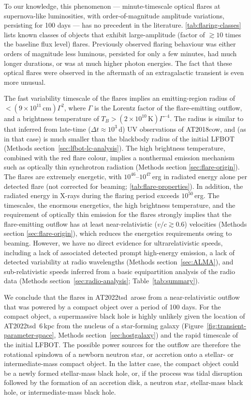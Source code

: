 \documentclass{nature_plusfigure}
\newcommand{\at}{AT2022tsd}
\begin{document}
To our knowledge, this phenomenon --- minute-timescale optical flares at supernova-like luminosities, with order-of-magnitude amplitude variations, persisting for 100 days --- has no precedent in the literature.
\ref{tab:flaring-classes} lists known classes of objects that exhibit large-amplitude (factor of $\gtrsim10$ times the baseline flux level) flares. Previously observed flaring behaviour was either orders of magnitude less luminous, persisted for only a few minutes, had much longer durations, or was at much higher photon energies.
The fact that these optical flares were observed in the aftermath of an extragalactic transient is even more unusual.

The fast variability timescale of the flares implies an emitting-region radius of $<(9\times10^{11}\,\mathrm{cm}) \Gamma^2$, where $\Gamma$ is the Lorentz factor of the flare-emitting outflow,
and a brightness temperature of $T_B>(2\times10^{10}\,\mathrm{K})\Gamma^{-4}$.
The radius is similar to that inferred from late-time ($\Delta t\approx10^3\,$d) UV observations of AT2018cow\cite{Chen2023b}, and (as in that case) is much smaller than the blackbody radius of the initial LFBOT (Methods section~\ref{sec:lfbot-lc-analysis}).
The high brightness temperature, combined with the red flare colour, implies a nonthermal emission mechanism such as optically thin synchrotron radiation (Methods section \ref{sec:flare-origin}).
The flares are extremely energetic, with $10^{46}$--$10^{47}$\,erg in radiated energy alone per detected flare (not corrected for beaming; \ref{tab:flare-properties}).
In addition, the radiated energy in X-rays during the flaring period exceeds $10^{50}$\,erg.
The timescales, the enormous energetics, the high brightness temperature, and the requirement of optically thin emission for the flares strongly implies that the flare-emitting outflow has at least near-relativistic ($v/c\gtrsim0.6$) velocities (Methods section \ref{sec:flare-origin}),
which reduces the energetics requirements owing to beaming.
However, we have no direct evidence for ultrarelativistic speeds, including a lack of associated detected prompt high-energy emission,
a lack of detected variability at radio wavelengths (Methods section~\ref{sec:ALMA}), and sub-relativistic speeds inferred from a basic equipartition analysis of the radio data (Methods section~\ref{sec:radio-analysis}; Table~\ref{tab:summary}).

We conclude that the flares in \at\ arose from a near-relativistic outflow that was powered by a compact object over a period of 100 days. For the compact object, a supermassive black hole is highly unlikely given the location of \at\ 6\,kpc from the nucleus of a star-forming galaxy (Figure~\ref{fig:transient-parameter-space}, Methods section~\ref{sec:hostgalaxy}) and the rapid timescale of the initial LFBOT. The possible power sources for the outflow are therefore the rotational spindown of a newborn neutron star, or accretion onto a stellar- or intermediate-mass compact object. In the latter case, the compact object could be a newly formed stellar-mass black hole, or, if the process was tidal disruption followed by the formation of an accretion disk, a neutron star, stellar-mass black hole, or intermediate-mass black hole. 
\end{document}
